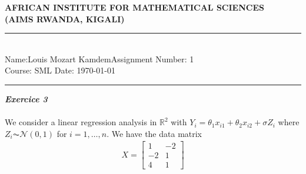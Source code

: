 \documentclass[12pt,a4paper]{article}
\newcommand{\student}{Louis Mozart Kamdem}
\begin{document}
	
	\thispagestyle{empty}
	\begin{center}
		\textbf{AFRICAN INSTITUTE FOR MATHEMATICAL SCIENCES \\[0.5cm]
			(AIMS RWANDA, KIGALI)}
		\vspace{1.0cm}
	\end{center}
	
	\noindent
	\rule{17cm}{0.2cm}\\[0.3cm]
	Name:\student \hfill Assignment Number: 1\\[0.1cm]
	Course: SML \hfill Date: \today\\
	\rule{17cm}{0.05cm}
	\vspace{1.0cm} 
	
	\textbf{\textit{Exercice 3}}\\
\\We consider a linear regression analysis in $\mathbb{R}^{2}$ with $Y_{i}=\theta_{1}x_{i1}+\theta_{2}x_{i2}+\sigma Z_{i}$ where $Z_{i}\AC \mathcal{N}(0,1)$ for $i = 1,\dots, n$. We have the data matrix
\begin{align}
	X = \begin{bmatrix}
		1&-2\\
		-2&1\\
		4&1
	\end{bmatrix}
\end{align}
	 
\end{document}
